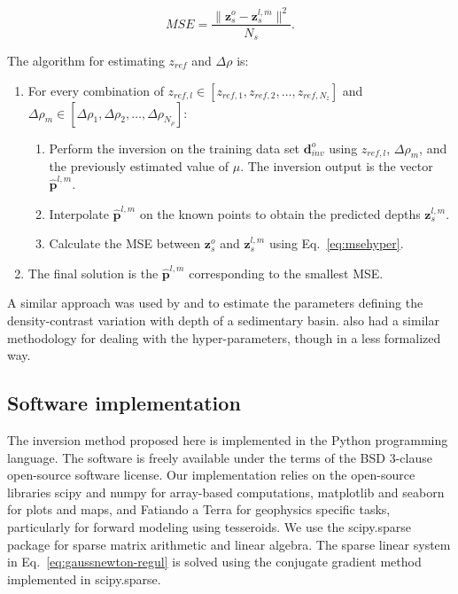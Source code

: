 \documentclass[extra,mreferee]{gji}
\begin{document}
\begin{equation}
    MSE = \dfrac{\|\mathbf{z}^o_s - \mathbf{z}^{l,m}_{s}\|^2}{N_s}.
    \label{eq:msehyper}
\end{equation}

The algorithm for estimating $z_{ref}$ and $\Delta\rho$ is:

\begin{enumerate}
    \item For every combination of
        $z_{ref,l} \in [z_{ref,1},z_{ref,2},\ldots,z_{ref,N_z}]$ and
        $\Delta\rho_m \in
         [\Delta\rho_1,\Delta\rho_2,\ldots,\Delta\rho_{N_{\rho}}]$:
    \begin{enumerate}
        \item Perform the inversion on the training data set
            $\mathbf{d}^o_{inv}$ using $z_{ref,l}$, $\Delta\rho_m$, and
            the previously estimated value of $\mu$.
            The inversion output is the vector $\mathbf{\hat{p}}^{l,m}$.
        \item Interpolate $\mathbf{\hat{p}}^{l,m}$
            on the known points to obtain the predicted depths
            $\mathbf{z}_s^{l,m}$.
        \item Calculate the MSE between $\mathbf{z}_s^o$ and
            $\mathbf{z}_s^{l,m}$ using Eq.~\ref{eq:msehyper}.
    \end{enumerate}
    \item The final solution is the $\mathbf{\hat{p}}^{l,m}$ corresponding to
        the smallest MSE.
\end{enumerate}

A similar approach was used by \citet{silva2006} and \citet{martins2010}
to estimate the parameters defining
the density-contrast variation with depth
of a sedimentary basin.
\citet{vandermeijde2013} also had
a similar methodology for dealing with the hyper-parameters,
though in a less formalized way.



\subsection{Software implementation}\label{sec:software}

The inversion method proposed here is implemented in the Python programming
language.
The software is freely available
under the terms of the BSD 3-clause open-source software license.
Our implementation relies on the open-source libraries
scipy and numpy \citep[][ \url{http://scipy.org}]{jones2001}
for array-based computations,
matplotlib \citep[][ \url{http://matplotlib.org}]{hunter2007}
and seaborn
\citep[][ \url{http://stanford.edu/~mwaskom/software/seaborn}]{waskom2015}
for plots and maps,
and Fatiando a Terra \citep[][ \url{http://www.fatiando.org}]{uieda2013a}
for geophysics specific tasks,
particularly for forward modeling using tesseroids.
We use the scipy.sparse package for sparse matrix arithmetic and linear
algebra.
The sparse linear system in Eq.~\ref{eq:gaussnewton-regul}
is solved using the conjugate gradient method implemented in scipy.sparse.
\end{document}
